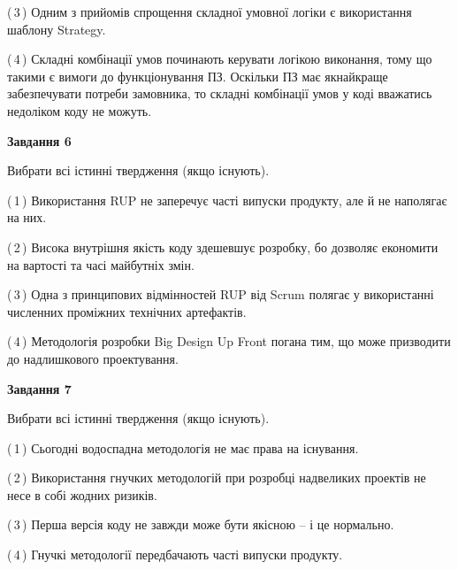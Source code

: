 \documentclass[10pt, ukrainian]{article}
\begin{document}
{\begin {large}
(\,3\,) Одним з прийомів спрощення складної умовної логіки є використання шаблону Strategy. %



(\,4\,) Складні комбінації умов починають керувати логікою виконання, тому що такими є вимоги до функціонування ПЗ. Оскільки ПЗ має якнайкраще забезпечувати потреби замовника, то складні комбінації умов у коді вважатись недоліком коду не можуть. %

\newpage

{\begin {center}\textbf{Завдання 6}\end {center}}\par
Вибрати всі істинні твердження (якщо існують).\par
\vspace{2mm}



(\,1\,) Використання RUP не заперечує часті випуски продукту, але й не наполягає на них. %



(\,2\,) Висока внутрішня якість коду здешевшує розробку, бо дозволяє економити на вартості та часі майбутніх змін. %



(\,3\,) Одна з принципових відмінностей RUP від Scrum полягає у використанні численних проміжних технічних артефактів. %



(\,4\,) Методологія розробки Big Design Up Front погана тим, що може призводити до надлишкового проектування. %


{\begin {center}\textbf{Завдання 7}\end {center}}\par
Вибрати всі істинні твердження (якщо існують).\par
\vspace{2mm}



(\,1\,) Сьогодні водоспадна методологія не має права на існування. %



(\,2\,) Використання гнучких методологій при розробці надвеликих проектів не несе в собі жодних ризиків. %



(\,3\,) Перша версія коду не завжди може бути якісною -- і це нормально. %



(\,4\,) Гнучкі методології передбачають часті випуски продукту. %



\end{large}}
\end{document}
